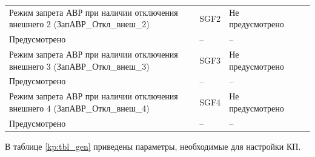 \begin{longtable}{|>{\centering\arraybackslash}m{5.3cm}|>{\centering\arraybackslash}m{3.3cm}|>{\centering\arraybackslash}m{4.2cm}|>{\centering\arraybackslash}m{1.8cm}|>{\centering\arraybackslash}m{1cm}|}
\hline
\centering Режим запрета АВР при наличии отключения внешнего 2 (ЗапАВР\_Откл\_внеш\_2)  & \centering SGF2 & \centering Не предусмотрено \\ Предусмотрено & \centering -- & \centering \arraybackslash -- \\
\hline
\centering Режим запрета АВР при наличии отключения внешнего 3 (ЗапАВР\_Откл\_внеш\_3)  & \centering SGF3 & \centering Не предусмотрено \\ Предусмотрено & \centering -- & \centering \arraybackslash -- \\
\hline
\centering Режим запрета АВР при наличии отключения внешнего 4 (ЗапАВР\_Откл\_внеш\_4)  & \centering SGF4 & \centering Не предусмотрено \\ Предусмотрено & \centering -- & \centering \arraybackslash -- \\
\hline
\end{longtable}
\normalsize





\par
 В таблице \ref{kp:tbl_gen} приведены параметры, необходимые для настройки КП.


